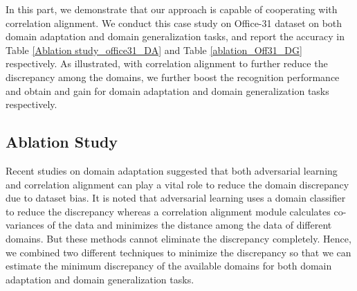 \documentclass[review]{elsarticle}
\begin{document}
In this part, we demonstrate that our approach is capable of cooperating
with correlation alignment. We conduct this case study on
Office-31 dataset on both domain adaptation and domain generalization tasks, and report the accuracy in Table \ref{Ablation study_office31_DA} and Table \ref{ablation_Off31_DG} respectively. As illustrated, with
correlation alignment to further reduce the discrepancy among the domains, we further boost the recognition performance and obtain  and  gain for domain adaptation and domain generalization tasks respectively.




\subsection{Ablation Study}

Recent studies on domain adaptation suggested that both adversarial learning \cite{pmlr-v37-ganin15,8099799} and correlation alignment \cite{DBLP:conf/icml/LongC0J15,DBLP:journals/corr/ZellingerGLNS17,dcoral} can play a vital role to reduce the domain discrepancy due to dataset bias. It is noted that adversarial learning uses a domain classifier to reduce the discrepancy whereas a correlation alignment module calculates co-variances of the data and minimizes the distance among the data of different domains. But these methods cannot eliminate the discrepancy completely. Hence, we combined two different techniques to minimize the discrepancy so that we can estimate the minimum discrepancy of the available domains for both domain adaptation and domain generalization tasks.

\begin{table*}[!htbp]
\fontsize{5}{6}\selectfont 
\begin{center}
\end{center}
\caption{Ablation study on Office-31 dataset in the context of domain adaptation.}
\label{Ablation study_office31_DA}
\end{table*}
\end{document}
